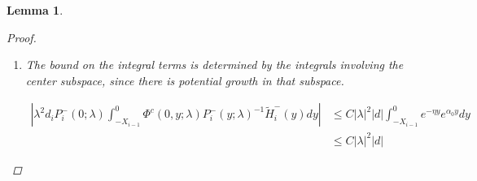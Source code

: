 \documentclass[12pt]{article}
\newtheorem{lemma}{Lemma}
\begin{document}
\begin{lemma}
\begin{proof}
\begin{enumerate}
To put this in terms of $c_i^-$, we use the expression

\[
c_i^+ = c_i^- + P_0^c(\lambda) D_i d + A_2(\lambda)_i^c(b, c^-, d) )
\]

from Lemma \ref{inv1}, together with the bound for $A_2$, to get

\begin{align*}
e^{-\nu(\lambda)X_i} c_i^+ &= e^{-\nu(\lambda)X_i} c_i^- 
+ e^{-\nu(\lambda)X_i} P_0^c(\lambda) D_i d + e^{-\nu(\lambda)X_i} A_2(\lambda)_i^c(b, d)\\
&= e^{-\nu(\lambda)X_i} c_i^- + \mathcal{O}\Big( e^{-(\alpha_0 - \eta) X_i} ( |\lambda| + e^{-\alpha_0 X_i} ) |d| \\
&+ e^{-(\alpha - \eta) X_i} (|b_i^+| + |b_{i+1}^-|) + e^{-\alpha X_i} |e^{-\nu(\lambda)X_i} c_i^-| + e^{-(\alpha - \eta) X_i}(|\lambda|^2|d| + |D_i||d| ) \Big)
\end{align*}

Since $D_i = \mathcal{O}(e^{-\alpha_0 X_i}$, $e^{-(\alpha - \eta) X_i} D_i = \mathcal{O}(e^{-2 \alpha X_i}$, this simplifies to

\begin{align}\label{tildecminus2}
e^{-\nu(\lambda)X_i} c_i^+
&= e^{-\nu(\lambda)X_i} c_i^- + \mathcal{O}\Big( 
e^{-(\alpha - \eta) X_i} (|b_i^+| + |b_{i+1}^-|) + e^{-\alpha X_i} |\tilde{c}_i^-|) 
+ ( |\lambda| + e^{-\alpha X_i} )^2 |d| \Big)
\end{align}

which gives us the overall estimate

\begin{align*}
&|(P_i^+(0; \lambda) - P^+(0))P_0^c(0) e^{-\nu(\lambda)X_i} c_i^+ + P_i^+(0; \lambda) (P_0^c(\lambda) - P_0^c(0)) e^{-\nu(\lambda)X_i} c_i^+| \\
&\leq C (e^{-\alpha X_m} + |\lambda|) \Big( e^{-\nu(\lambda)X_i} c_i^-  
+ e^{-(\alpha - \eta) X_i} (|b_i^+| + |b_{i+1}^-|) + e^{-\alpha X_i} |\tilde{c}_i^-| 
+ ( |\lambda| + e^{-\alpha X_i} )^2 |d| \Big) \\
&\leq C (e^{-\alpha X_m} + |\lambda|) \Big( |\tilde{c}_i^-|  
+ e^{-(\alpha - \eta) X_i} (|b_i^+| + |b_{i+1}^-|) 
+ ( |\lambda| + e^{-\alpha X_i} )^2 |d| \Big)
\end{align*}

\item The bound on the integral terms is determined by the integrals involving the center subspace, since there is potential growth in that subspace.

\begin{align*}
\left| \lambda^2 d_i P_i^-(0; \lambda) \int_{-X_{i-1}}^0 \Phi^c(0, y; \lambda) P_i^-(y; \lambda)^{-1} \tilde{H}_i^-(y) dy \right| &\leq C |\lambda|^2 |d| \int_{-X_{i-1}}^0 e^{-\eta y} e^{\alpha_0 y} dy \\
&\leq C |\lambda|^2 |d|
\end{align*}


\end{enumerate}
\end{proof}
\end{lemma}
\end{document}
